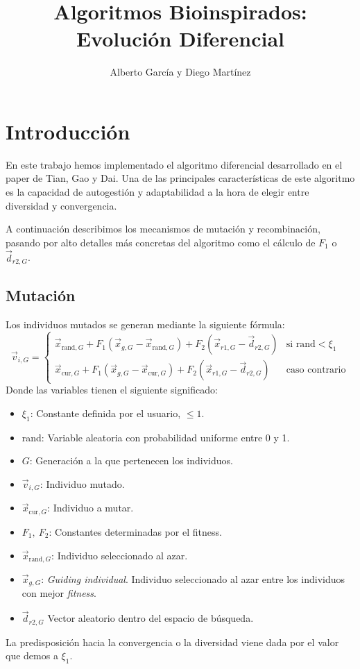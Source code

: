 \documentclass{article}
\title{Algoritmos Bioinspirados: Evolución Diferencial}
\author{Alberto García y Diego Martínez}
\begin{document}
\maketitle
\section{Introducción}
En este trabajo hemos implementado el algoritmo diferencial desarrollado en el paper de Tian, Gao y Dai\cite{mainPaper}. Una de las principales características de este algoritmo es la capacidad de autogestión y adaptabilidad a la hora de elegir entre diversidad y convergencia.

A continuación describimos los mecanismos de mutación y recombinación, pasando por alto detalles más concretas del algoritmo como el cálculo de $F_1$ o $\vec{d}_{r2, G}$.
\subsection{Mutación}
Los individuos mutados se generan mediante la siguiente fórmula:
\begin{equation}
    \vec{v}_{i,G} = \left\{\begin{array}{ll}
            \vec{x}_{\text{rand},G} + F_1(\vec{x}_{g,G}-\vec{x}_{\text{rand}, G})+ F_2(\vec{x}_{r1,G}-\vec{d}_{r2, G})&\text{si rand}<\xi_1\\
            \vec{x}_{\text{cur},G} + F_1(\vec{x}_{g,G}-\vec{x}_{\text{cur}, G})+ F_2(\vec{x}_{r1,G}-\vec{d}_{r2, G})&\text{caso contrario}
    \end{array}\right.
\label{ec_mutacion}
\end{equation}
Donde las variables tienen el siguiente significado:
\begin{itemize}
    \item $\xi_1$: Constante definida por el usuario, $\le1$.
    \item rand: Variable aleatoria con probabilidad uniforme entre 0 y 1.
    \item $G$: Generación a la que pertenecen los individuos.
    \item $\vec{v}_{i,G}$: Individuo mutado.
    \item $\vec{x}_{\text{cur},G}$: Individuo a mutar.
    \item $F_1,\ F_2$: Constantes determinadas por el fitness.
    \item $\vec{x}_{\text{rand},G}$: Individuo seleccionado al azar.
    \item $\vec{x}_{g,G}$: \textit{Guiding individual}. Individuo seleccionado al azar entre los individuos con mejor \textit{fitness}.
    \item $\vec{d}_{r2,G}$ Vector aleatorio dentro del espacio de búsqueda.
\end{itemize}
La predisposición hacia la convergencia o la diversidad viene dada por el valor que demos a $\xi_1$.
\end{document}
